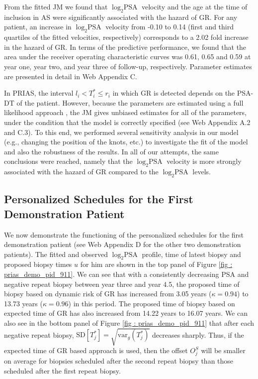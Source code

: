 From the fitted JM we found that $\log_2 \mbox{PSA}$ velocity and the age at the time of inclusion in AS were significantly associated with the hazard of GR. For any patient, an increase in $\log_2 \mbox{PSA}$ velocity from -0.10 to 0.14 (first and third quartiles of the fitted velocities, respectively) corresponds to a 2.02 fold increase in the hazard of GR. In terms of the predictive performance, we found that the area under the receiver operating characteristic curves \citep{landmarking2017} was 0.61, 0.65 and 0.59 at year one, year two, and year three of follow-up, respectively. Parameter estimates are presented in detail in Web Appendix C.

In PRIAS, the interval $l_i < T_i^* \leq r_i$ in which GR is detected depends on the PSA-DT of the patient. However, because the parameters are estimated using a full likelihood approach \citep{tsiatis2004joint}, the JM gives unbiased estimates for all of the parameters, under the condition that the model is correctly specified (see Web Appendix A.2 and C.3). To this end, we performed several sensitivity analysis in our model (e.g., changing the position of the knots, etc.) to investigate the fit of the model and also the robustness of the results. In all of our attempts, the same conclusions were reached, namely that the $\log_2 \mbox{PSA}$ velocity is more strongly associated with the hazard of GR compared to the $\log_2 \mbox{PSA}$ levels.

\subsection{Personalized Schedules for the First Demonstration Patient}
\label{subsec : demo_prias_pers_schedule}
We now demonstrate the functioning of the personalized schedules for the first demonstration patient (see Web Appendix D for the other two demonstration patients). The fitted and observed $\log_2 \mbox{PSA}$ profile, time of latest biopsy and proposed biopsy times $u$ for him are shown in the top panel of Figure \ref{fig : prias_demo_pid_911}. We can see that with a consistently decreasing PSA and negative repeat biopsy between year three and year 4.5, the proposed time of biopsy based on dynamic risk of GR has increased from 3.05 years ($\kappa=0.94$) to 13.73 years ($\kappa=0.96$) in this period. The proposed time of biopsy based on expected time of GR has also increased from 14.22 years to 16.07 years. We can also see in the bottom panel of Figure \ref{fig : prias_demo_pid_911} that after each negative repeat biopsy, $\mbox{SD}[T^*_j] = \sqrt{\mbox{var}_g(T^*_j)}$ decreases sharply. Thus, if the expected time of GR based approach is used, then the offset $O^S_j$ will be smaller on average for biopsies scheduled after the second repeat biopsy than those scheduled after the first repeat biopsy.

